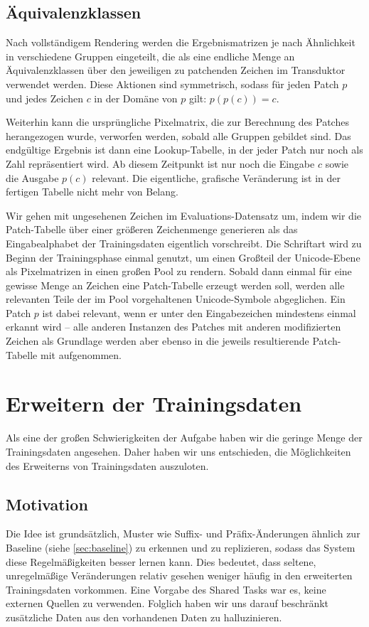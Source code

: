 \documentclass[11pt,a4paper]{article}
\begin{document}
\subsection{Äquivalenzklassen}
Nach vollständigem Rendering werden die Ergebnismatrizen je nach Ähnlichkeit in verschiedene Gruppen eingeteilt, die als eine endliche Menge an Äquivalenzklassen über den jeweiligen zu patchenden Zeichen im Transduktor verwendet werden. Diese Aktionen sind symmetrisch, sodass für jeden Patch $p$ und jedes Zeichen $c$ in der Domäne von $p$ gilt: $p(p(c)) = c$.

Weiterhin kann die ursprüngliche Pixelmatrix, die zur Berechnung des Patches herangezogen wurde, verworfen werden, sobald alle Gruppen gebildet sind. Das endgültige Ergebnis ist dann eine Lookup-Tabelle, in der jeder Patch nur noch als Zahl repräsentiert wird. Ab diesem Zeitpunkt ist nur noch die Eingabe $c$ sowie die Ausgabe $p(c)$ relevant. Die eigentliche, grafische Veränderung ist in der fertigen Tabelle nicht mehr von Belang.

Wir gehen mit ungesehenen Zeichen im Evaluations-Datensatz um, indem wir die Patch-Tabelle über einer größeren Zeichenmenge generieren als das Eingabealphabet der Trainingsdaten eigentlich vorschreibt. Die Schriftart wird zu Beginn der Trainingsphase einmal genutzt, um einen Großteil der Unicode-Ebene als Pixelmatrizen in einen großen Pool zu rendern. Sobald dann einmal für eine gewisse Menge an Zeichen eine Patch-Tabelle erzeugt werden soll, werden alle relevanten Teile der im Pool vorgehaltenen Unicode-Symbole abgeglichen. Ein Patch $p$ ist dabei relevant, wenn er unter den Eingabezeichen mindestens einmal erkannt wird -- alle anderen Instanzen des Patches mit anderen modifizierten Zeichen als Grundlage werden aber ebenso in die jeweils resultierende Patch-Tabelle mit aufgenommen.

\section{Erweitern der Trainingsdaten}
\label{sec:enhancer}

Als eine der großen Schwierigkeiten der Aufgabe haben wir die geringe Menge der Trainingsdaten
angesehen. Daher haben wir uns entschieden, die Möglichkeiten des Erweiterns von Trainingsdaten auszuloten.

\subsection{Motivation}
Die Idee ist grundsätzlich, Muster wie Suffix- und Präfix-Änderungen ähnlich zur Baseline (siehe \autoref{sec:baseline}) zu erkennen und zu replizieren, sodass das System diese Regelmäßigkeiten besser lernen kann. Dies bedeutet, dass seltene, unregelmäßige Veränderungen relativ gesehen weniger häufig in den erweiterten Trainingsdaten vorkommen.
Eine Vorgabe des Shared Tasks war es, keine externen Quellen zu verwenden. Folglich haben wir uns darauf beschränkt zusätzliche Daten aus den vorhandenen Daten zu halluzinieren.
\end{document}
